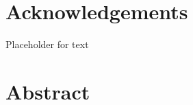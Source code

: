 \documentclass{ttuthes2007}
\begin{document}

\frontmatter

\chapter{\textbf{Acknowledgements}}
Placeholder for text


\newpage
\begin{singlespace}
\tableofcontents
\end{singlespace}

\chapter{\textbf{Abstract}}



\end{document}
